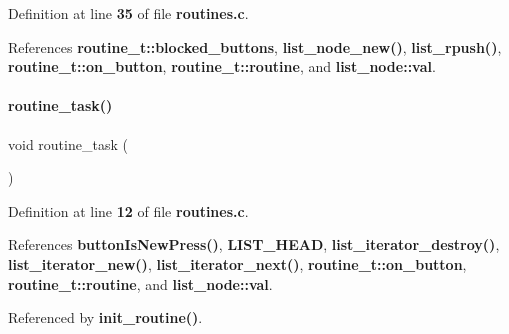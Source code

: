 Definition at line \textbf{ 35} of file \textbf{ routines.\+c}.



References \textbf{ routine\+\_\+t\+::blocked\+\_\+buttons}, \textbf{ list\+\_\+node\+\_\+new()}, \textbf{ list\+\_\+rpush()}, \textbf{ routine\+\_\+t\+::on\+\_\+button}, \textbf{ routine\+\_\+t\+::routine}, and \textbf{ list\+\_\+node\+::val}.

\mbox{\label{routines_8h_a230cdcefb410a429fb6baba1f88fc9ba}} 
\paragraph{routine\+\_\+task()}
{\footnotesize\ttfamily void routine\+\_\+task (\begin{DoxyParamCaption}{ }\end{DoxyParamCaption})}



Definition at line \textbf{ 12} of file \textbf{ routines.\+c}.



References \textbf{ button\+Is\+New\+Press()}, \textbf{ L\+I\+S\+T\+\_\+\+H\+E\+AD}, \textbf{ list\+\_\+iterator\+\_\+destroy()}, \textbf{ list\+\_\+iterator\+\_\+new()}, \textbf{ list\+\_\+iterator\+\_\+next()}, \textbf{ routine\+\_\+t\+::on\+\_\+button}, \textbf{ routine\+\_\+t\+::routine}, and \textbf{ list\+\_\+node\+::val}.



Referenced by \textbf{ init\+\_\+routine()}.

